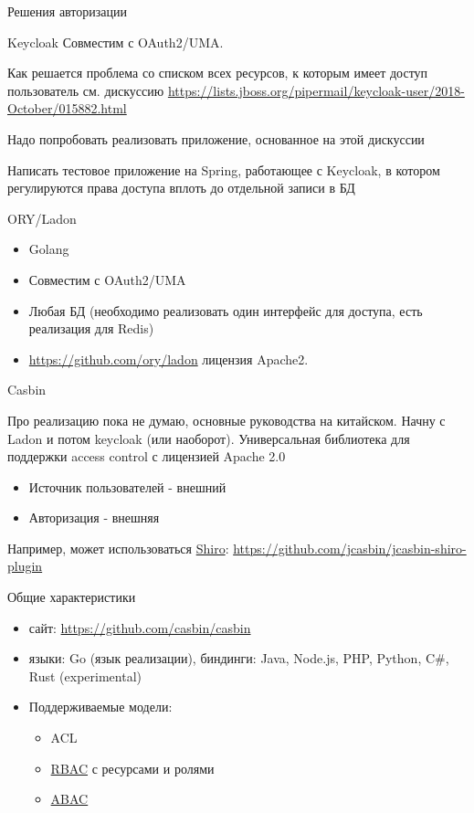 \documentclass[presentation]{beamer}
\begin{document}
\begin{frame}[label={sec:org24b9295},fragile]{Решения авторизации}
\begin{block}{Keycloak}
Совместим с OAuth2/UMA.

\begin{block}{Как решается проблема со списком всех ресурсов, к которым имеет доступ пользователь}
см. дискуссию \url{https://lists.jboss.org/pipermail/keycloak-user/2018-October/015882.html}

Надо попробовать реализовать приложение, основанное на этой дискуссии
\end{block}



\begin{block}{Написать тестовое приложение на Spring, работающее с Keycloak, в котором регулируются права доступа вплоть до отдельной записи в БД}
\end{block}
\end{block}

\begin{block}{ORY/Ladon}
\begin{itemize}
\item Golang
\item Совместим с OAuth2/UMA
\item Любая БД (необходимо реализовать один интерфейс для доступа, есть реализация для Redis)
\item \url{https://github.com/ory/ladon} лицензия Apache2.
\end{itemize}
\end{block}

\begin{block}{Casbin}
\begin{block}{Про реализацию пока не думаю, основные руководства на китайском. Начну с Ladon и потом keycloak (или наоборот).}
Универсальная библиотека для поддержки access control с лицензией Apache 2.0

\begin{itemize}
\item Источник пользователей - внешний
\item Авторизация - внешняя
\end{itemize}

Например, может использоваться \hyperlink{sec:org9c63c5e}{Shiro}: \url{https://github.com/jcasbin/jcasbin-shiro-plugin}
\end{block}

\begin{block}{Общие характеристики}
\begin{itemize}
\item сайт: \url{https://github.com/casbin/casbin}
\item языки: Go (язык реализации), биндинги: Java, Node.js, PHP, Python, C\#, Rust (experimental)
\item Поддерживаемые модели:
\begin{itemize}
\item ACL
\item \hyperlink{org03a534b}{RBAC} с ресурсами и ролями
\item \hyperlink{org4cc13c0}{ABAC}
\end{itemize}


\end{itemize}
\end{block}
\end{block}
\end{frame}
\end{document}
